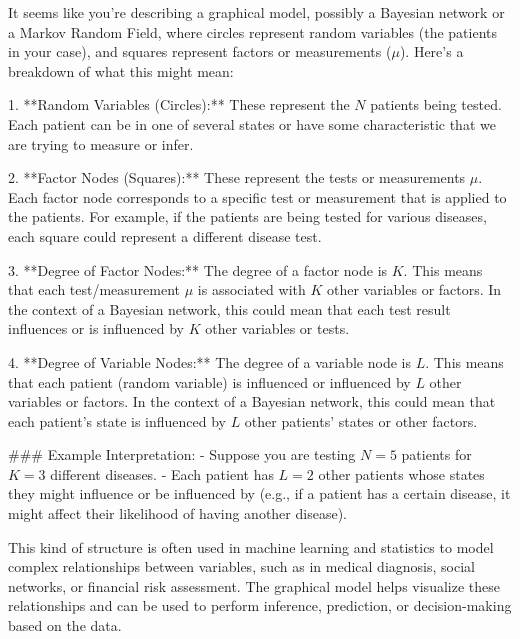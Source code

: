 It seems like you're describing a graphical model, possibly a Bayesian network or a Markov Random Field, where circles represent random variables (the patients in your case), and squares represent factors or measurements (\(\mu\)). Here's a breakdown of what this might mean:

1. **Random Variables (Circles):** These represent the \(N\) patients being tested. Each patient can be in one of several states or have some characteristic that we are trying to measure or infer.

2. **Factor Nodes (Squares):** These represent the tests or measurements \(\mu\). Each factor node corresponds to a specific test or measurement that is applied to the patients. For example, if the patients are being tested for various diseases, each square could represent a different disease test.

3. **Degree of Factor Nodes:** The degree of a factor node is \(K\). This means that each test/measurement \(\mu\) is associated with \(K\) other variables or factors. In the context of a Bayesian network, this could mean that each test result influences or is influenced by \(K\) other variables or tests.

4. **Degree of Variable Nodes:** The degree of a variable node is \(L\). This means that each patient (random variable) is influenced or influenced by \(L\) other variables or factors. In the context of a Bayesian network, this could mean that each patient's state is influenced by \(L\) other patients' states or other factors.

### Example Interpretation:
- Suppose you are testing \(N = 5\) patients for \(K = 3\) different diseases.
- Each patient has \(L = 2\) other patients whose states they might influence or be influenced by (e.g., if a patient has a certain disease, it might affect their likelihood of having another disease).

This kind of structure is often used in machine learning and statistics to model complex relationships between variables, such as in medical diagnosis, social networks, or financial risk assessment. The graphical model helps visualize these relationships and can be used to perform inference, prediction, or decision-making based on the data.